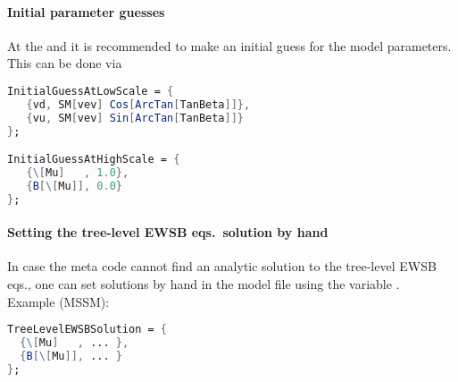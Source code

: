 \paragraph{Initial parameter guesses} At the  and
 it is recommended to make an initial guess for the
model parameters.  This can be done via
\begin{lstlisting}[language=Mathematica]
InitialGuessAtLowScale = {
   {vd, SM[vev] Cos[ArcTan[TanBeta]]},
   {vu, SM[vev] Sin[ArcTan[TanBeta]]}
};

InitialGuessAtHighScale = {
   {\[Mu]   , 1.0},
   {B[\[Mu]], 0.0}
};
\end{lstlisting}

\paragraph{Setting the tree-level EWSB eqs.\ solution by hand} In case
the meta code cannot find an analytic solution to the tree-level EWSB
eqs., one can set solutions by hand in the model file using the
variable .
\\
Example (MSSM):
\begin{lstlisting}[language=Mathematica]
TreeLevelEWSBSolution = {
  {\[Mu]   , ... },
  {B[\[Mu]], ... }
};
\end{lstlisting}


